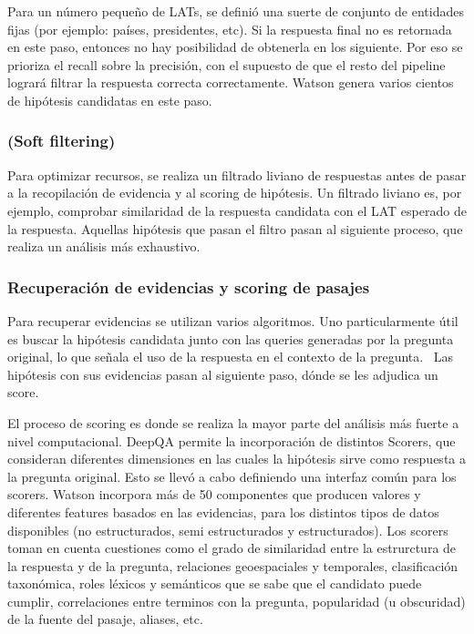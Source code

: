 Para un número pequeño de LATs, se definió una suerte de conjunto
de entidades fijas (por ejemplo: países, presidentes, etc). Si la
respuesta final no es retornada en este paso, entonces no hay
posibilidad de obtenerla en los siguiente. Por eso se prioriza el
recall sobre la precisión, con el supuesto de que el resto del
pipeline logrará filtrar la respuesta correcta correctamente. Watson
genera varios cientos de hipótesis candidatas en este paso.


\bigskip

\subsubsection*{(Soft filtering)}

Para optimizar recursos, se realiza un filtrado liviano de respuestas
antes de pasar a la recopilación de evidencia y al scoring de
hipótesis. Un filtrado liviano es, por ejemplo, comprobar similaridad
de la respuesta candidata con el LAT esperado de la respuesta. Aquellas
hipótesis que pasan el filtro pasan al siguiente proceso, que realiza
un análisis más exhaustivo.


\bigskip

\subsubsection*{Recuperación de evidencias y scoring de pasajes}

Para recuperar evidencias se utilizan varios algoritmos. Uno
particularmente útil es buscar la hipótesis candidata junto con las
queries generadas por la pregunta original, lo que señala el uso de
la respuesta en el contexto de la pregunta. \ Las hipótesis con sus
evidencias pasan al siguiente paso, dónde se les adjudica un score. 

El proceso de scoring es donde se realiza la mayor parte del análisis
más fuerte a nivel computacional. DeepQA permite la incorporación
de distintos Scorers, que consideran diferentes dimensiones en las
cuales la hipótesis sirve como respuesta a la pregunta original. Esto
se llevó a cabo definiendo una interfaz común para los scorers.
Watson incorpora más de 50 componentes que producen valores y
diferentes features basados en las evidencias, para los distintos tipos
de datos disponibles (no estructurados, semi estructurados y
estructurados). Los scorers toman en cuenta cuestiones como el grado de
similaridad entre la estrurctura de la respuesta y de la pregunta,
relaciones geoespaciales y temporales, clasificación taxonómica,
roles léxicos y semánticos que se sabe que el candidato puede
cumplir, correlaciones entre terminos con la pregunta, popularidad (u
obscuridad) de la fuente del pasaje, aliases, etc.

